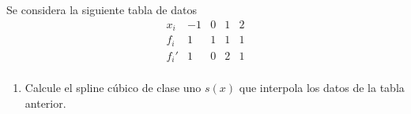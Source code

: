 \begin{ejercicio}
    Se considera la siguiente tabla de datos
    \begin{equation*}
        \begin{array}{c|cccc}
            x_i & -1 & 0 & 1 & 2 \\ \hline
            f_i & 1 & 1 & 1 & 1 \\ \hline
            f_i' & 1 & 0 & 2 & 1\\
        \end{array}
    \end{equation*}

    \begin{enumerate}
        \item Calcule el spline cúbico de clase uno $s(x)$ que interpola los datos de la tabla anterior.


\end{enumerate}
\end{ejercicio}
